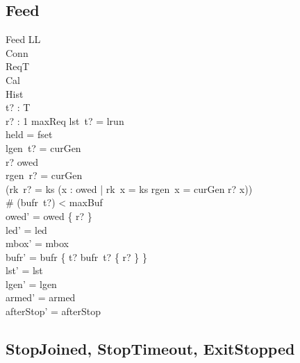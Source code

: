 \documentclass[a4paper,10pt,fleqn]{article}
\begin{document}
\subsection{Feed}

\begin{schema}{Feed}
  \Delta LL \\
  \Xi Conn \\
  \Xi ReqT \\
  \Xi Cal \\
  \Xi Hist \\
  t? : T \\
  r? : 1 \upto maxReq
\where
  lst~t? = lrun \\
  held = fset \\
  lgen~t? = curGen \\
  r? \in owed \\
  rgen~r? = curGen \\
  (rk~r? = ks \implies
    (\forall x : owed | rk~x = ks \land rgen~x = curGen \spot r? \leq x)) \\
  \# (bufr~t?) < maxBuf \\
  owed' = owed \setminus \{ r? \} \\
  led' = led \\
  mbox' = mbox \\
  bufr' = bufr \oplus \{ t? \mapsto bufr~t? \cup \{ r? \} \} \\
  lst' = lst \\
  lgen' = lgen \\
  armed' = armed \\
  afterStop' = afterStop
\end{schema}

\subsection{StopJoined, StopTimeout, ExitStopped}
\end{document}
